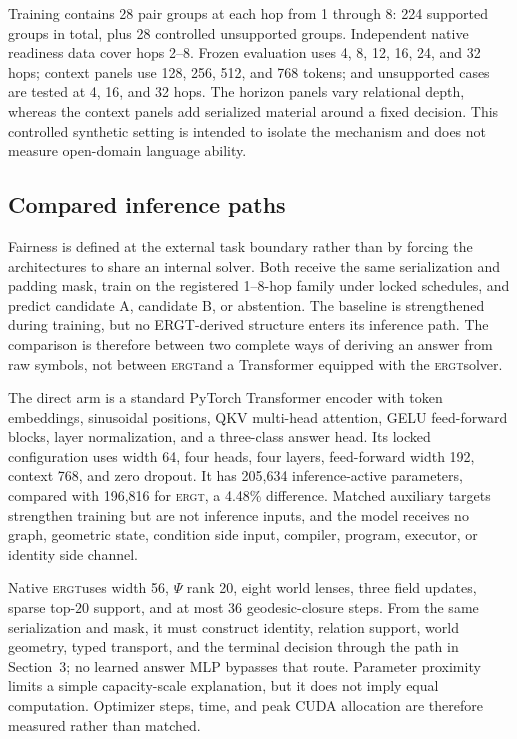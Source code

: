 \documentclass[11pt]{article}
\newcommand{\ERGT}{\textsc{ergt}}
\begin{document}
Training contains 28 pair groups at each hop from 1 through 8: 224 supported
groups in total, plus 28 controlled unsupported groups. Independent native
readiness data cover hops 2--8. Frozen evaluation uses 4, 8, 12, 16, 24, and
32 hops; context panels use 128, 256, 512, and 768 tokens; and unsupported
cases are tested at 4, 16, and 32 hops. The horizon panels vary relational
depth, whereas the context panels add serialized material around a fixed
decision. This controlled synthetic setting is intended to isolate the
mechanism and does not measure open-domain language ability.

\subsection{Compared inference paths}

Fairness is defined at the external task boundary rather than by forcing the
architectures to share an internal solver. Both receive the same serialization
and padding mask, train on the registered 1--8-hop family under locked
schedules, and predict candidate A, candidate B, or abstention. The baseline is
strengthened during training, but no ERGT-derived structure enters its inference
path. The comparison is therefore between two complete ways of deriving an
answer from raw symbols, not between \ERGT and a Transformer equipped with the
\ERGT solver.

The direct arm is a standard PyTorch Transformer encoder with token embeddings,
sinusoidal positions, QKV multi-head attention, GELU feed-forward blocks,
layer normalization, and a three-class answer head. Its locked configuration
uses width 64, four heads, four layers, feed-forward width 192, context 768,
and zero dropout. It has 205,634 inference-active parameters, compared with
196,816 for \ERGT, a 4.48\% difference. Matched auxiliary targets strengthen
training but are not inference inputs, and the model receives no graph,
geometric state, condition side input, compiler, program, executor, or identity
side channel.

Native \ERGT uses width 56, $\Psi$ rank 20, eight world lenses, three field
updates, sparse top-$20$ support, and at most 36 geodesic-closure steps. From
the same serialization and mask, it must construct identity, relation support,
world geometry, typed transport, and the terminal decision through the path in
Section~3; no learned answer MLP bypasses that route. Parameter proximity limits
a simple capacity-scale explanation, but it does not imply equal computation.
Optimizer steps, time, and peak CUDA allocation are therefore measured rather
than matched.
\end{document}
